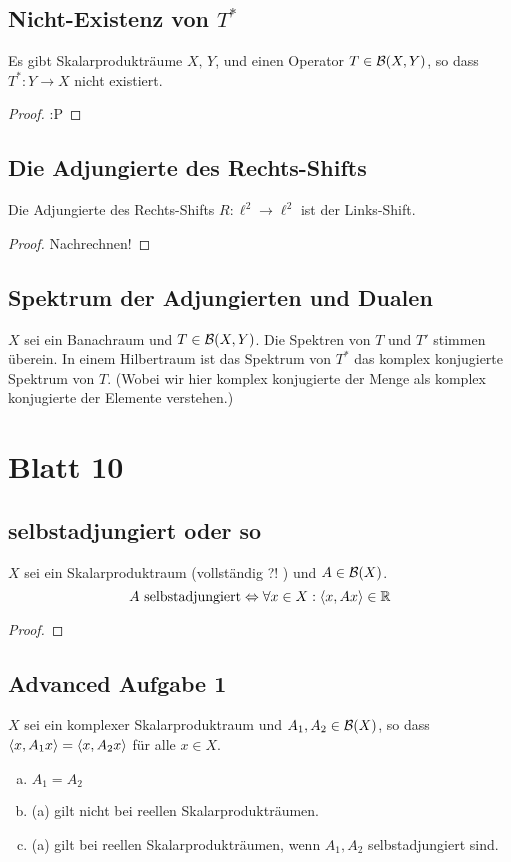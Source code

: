 \documentclass[FunkAnaskriptSS2017.tex]{subfiles}
\begin{document}
\subsection{ Nicht-Existenz von $T^*$}
\label{B9.3}
	Es gibt Skalarprodukträume $X,\,Y$, und einen Operator $T\in \mathcal{B}(X,Y)$, so dass $T^* : Y \to X$ nicht existiert.
	
	\begin{proof}
	:P
	\end{proof}


\subsection{ Die Adjungierte des Rechts-Shifts}
\label{B9.4}
	Die Adjungierte des Rechts-Shifts $R:\ell^2 \to \ell ^2$ ist der Links-Shift.
	\begin{proof}
	Nachrechnen!
	\end{proof}


\subsection{ Spektrum der Adjungierten und Dualen}
\label{B9.5}
	$X$ sei ein Banachraum und $T\in \mathcal{B}(X,Y)$. Die Spektren von $T$ und $T'$ stimmen überein. In einem Hilbertraum ist das Spektrum von $T^*$ das komplex konjugierte Spektrum von $T$. (Wobei wir hier komplex konjugierte der Menge als komplex konjugierte der Elemente verstehen.)
	

\newpage
\section{ Blatt 10}

\subsection{ selbstadjungiert oder so}
\label{B10.1}
	$X$ sei ein Skalarproduktraum (vollständig ?! ) und $A \in \mathcal{B}(X)$. 
	$$ A \text{ selbstadjungiert} \Leftrightarrow \forall x \in X : \left \langle x,Ax \right \rangle \in \mathbb{R} $$
	\begin{proof}
	
	\end{proof}


\subsection{ Advanced Aufgabe 1}
\label{B10.2}
	$X$ sei ein komplexer Skalarproduktraum und $A_1, A_2 \in \mathcal{B}(X)$, so dass $\left \langle x, A_1 x \right \rangle = \left \langle x, A_2 x \right \rangle$ für alle $x\in X$.
	\begin{enumerate}[(a)]
		\item $A_1 = A_2$
		\item (a) gilt nicht bei reellen Skalarprodukträumen.
		\item (a) gilt bei reellen Skalarprodukträumen, wenn $A_1,A_2$ selbstadjungiert sind.
	\end{enumerate}
\end{document}
